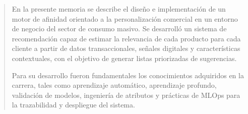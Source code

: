 \documentclass[
    11pt,
    spanish,
    singlespacing,
    parskip,
    headsepline,
    bookmarks=true,
    unicode=true,
    pdftoolbar=true,
    pdfmenubar=true,
    pdffitwindow=false,
    colorlinks=true,
    linkcolor=blue,
    citecolor=blue,
    urlcolor=blue
]{MastersDoctoralThesis}
\def\textbf#1{#1}%
\begin{document}



\frontmatter %
\pagestyle{plain} %


\begin{abstract}
\addchaptertocentry{\abstractname} %
En la presente memoria se describe el diseño e implementación de un motor de afinidad orientado a la personalización comercial en un entorno de negocio del sector de consumo masivo. Se desarrolló un sistema de recomendación capaz de estimar la relevancia de cada producto para cada cliente a partir de datos transaccionales, señales digitales y características contextuales, con el objetivo de generar listas priorizadas de sugerencias. 

Para su desarrollo fueron fundamentales los conocimientos adquiridos en la carrera, tales como aprendizaje automático, aprendizaje profundo, validación de modelos, ingeniería de atributos y prácticas de MLOps para la trazabilidad y despliegue del sistema.
\end{abstract}




\tableofcontents
\listoffigures
\listoftables

\end{document}
